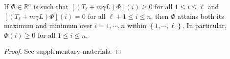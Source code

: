 \documentclass[letterpaper]{article} %
\begin{document}
\begin{lemma}
  \label{lem:maximum-principle}
  If $\Phi\in\mathbb{R}^n$ is such that $\left[\left( T_{\ell}+m\gamma L \right)\Phi\right] \left(i\right)\geq 0$ for all $1\leq i\leq \ell$ and $\left[\left( T_{\ell}+m\gamma L \right)\Phi\right] \left(i\right)=0$ for all $\ell+1\leq i\leq n$, then $\Phi$ attains both its maximum and minimum over $i=1,\cdots,n$ within $\left\{ 1,\cdots,\ell \right\}$. In particular, $\Phi\left(i\right)\geq 0$ for all $1\leq i\leq n$.
\end{lemma}
\begin{proof}
  See supplementary materials.
\end{proof}
\end{document}
